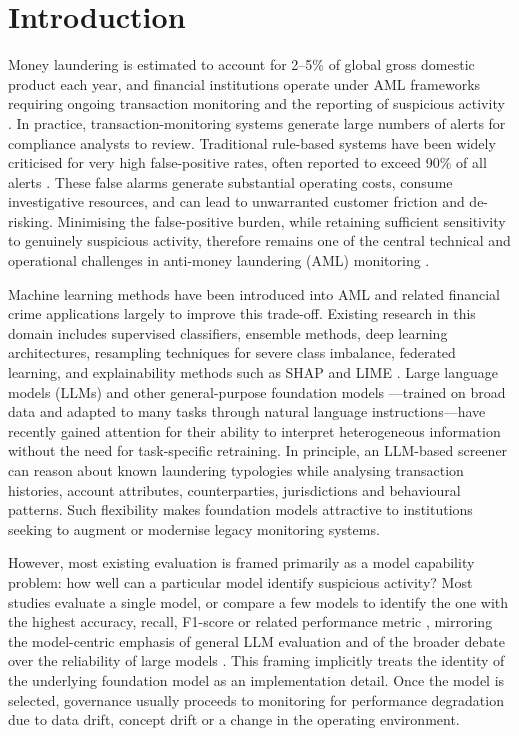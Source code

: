 \documentclass[pdflatex,sn-basic,Numbered]{sn-jnl}
\begin{document}
\section{Introduction}\label{sec:intro}

Money laundering is estimated to account for 2--5\% of global gross domestic product each year, and financial institutions operate under AML frameworks requiring ongoing transaction monitoring and the reporting of suspicious activity \cite{fatf-recs,unodc}. In practice, transaction-monitoring systems generate large numbers of alerts for compliance analysts to review. Traditional rule-based systems have been widely criticised for very high false-positive rates, often reported to exceed 90\% of all alerts \cite{jensen}. These false alarms generate substantial operating costs, consume investigative resources, and can lead to unwarranted customer friction and de-risking. Minimising the false-positive burden, while retaining sufficient sensitivity to genuinely suspicious activity, therefore remains one of the central technical and operational challenges in anti-money laundering (AML) monitoring \cite{alhashedi,smote,goecks,imbalance}.

Machine learning methods have been introduced into AML and related financial crime applications largely to improve this trade-off. Existing research in this domain includes supervised classifiers, ensemble methods, deep learning architectures, resampling techniques for severe class imbalance, federated learning, and explainability methods such as SHAP and LIME \cite{alhashedi,disc-alshatri,disc-bekkaye,goecks,imbalance,shap,disc-najem,lime,disc-yang,amlsim}. Large language models (LLMs) and other general-purpose foundation models \cite{fewshot,foundation}---trained on broad data and adapted to many tasks through natural language instructions---have recently gained attention for their ability to interpret heterogeneous information without the need for task-specific retraining. In principle, an LLM-based screener can reason about known laundering typologies while analysing transaction histories, account attributes, counterparties, jurisdictions and behavioural patterns. Such flexibility makes foundation models attractive to institutions seeking to augment or modernise legacy monitoring systems.

However, most existing evaluation is framed primarily as a model capability problem: how well can a particular model identify suspicious activity? Most studies evaluate a single model, or compare a few models to identify the one with the highest accuracy, recall, F1-score or related performance metric \cite{disc-alshatri,disc-bekkaye,disc-najem,disc-yang}, mirroring the model-centric emphasis of general LLM evaluation and of the broader debate over the reliability of large models \cite{helm,parrots}. This framing implicitly treats the identity of the underlying foundation model as an implementation detail. Once the model is selected, governance usually proceeds to monitoring for performance degradation due to data drift, concept drift or a change in the operating environment.
\end{document}
